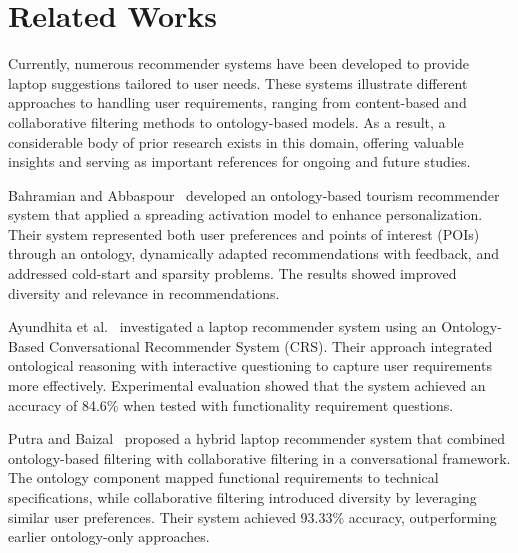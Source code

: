 \section{Related Works}
Currently, numerous recommender systems have been developed to provide laptop suggestions tailored to user needs. These systems illustrate different approaches to handling user requirements, ranging from content-based and collaborative filtering methods to ontology-based models. As a result, a considerable body of prior research exists in this domain, offering valuable insights and serving as important references for ongoing and future studies.



Bahramian and Abbaspour~\cite{bahramian2015} developed an ontology-based tourism recommender system that applied a spreading activation model to enhance personalization. Their system represented both user preferences and points of interest (POIs) through an ontology, dynamically adapted recommendations with feedback, and addressed cold-start and sparsity problems. The results showed improved diversity and relevance in recommendations.

Ayundhita et al.~\cite{ayundhita2019} investigated a laptop recommender system using an Ontology-Based Conversational Recommender System (CRS). Their approach integrated ontological reasoning with interactive questioning to capture user requirements more effectively. Experimental evaluation showed that the system achieved an accuracy of 84.6\% when tested with functionality requirement questions.


Putra and Baizal~\cite{putra2024} proposed a hybrid laptop recommender system that combined ontology-based filtering with collaborative filtering in a conversational framework. The ontology component mapped functional requirements to technical specifications, while collaborative filtering introduced diversity by leveraging similar user preferences. Their system achieved 93.33\% accuracy, outperforming earlier ontology-only approaches.
